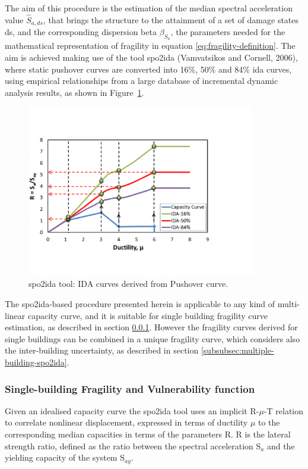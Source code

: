 The aim of this procedure is the estimation of the median spectral acceleration value $\hat{S}_{a,ds}$, that brings the structure to the attainment of a set of damage states ds, and the corresponding dispersion beta $\beta_{S_a}$, the parameters needed for the mathematical representation of fragility in equation \ref{eq:fragility-definition}. The aim is achieved making use of the tool spo2ida (Vamvatsikos and Cornell, 2006), where static pushover curves are converted into 16\%, 50\% and 84\% ida curves, using empirical relationships from a large database of incremental dynamic analysis results, as shown in Figure~\ref{fig:spo2ida}.

\begin{figure}[!htbp]
\centering
\includegraphics[width=10cm]{./figures/spo2ida.jpg}
\caption{spo2ida tool: IDA curves derived from Pushover curve.}
\label{fig:spo2ida}
\end{figure}

The spo2ida-based procedure presented herein is applicable to any kind of multi-linear capacity curve, and it is suitable for single building fragility curve estimation, as described in section \ref{subsubsec:single-building-spo2ida}. However the fragility curves derived for single buildings can be combined in a unique fragility curve, which considers also the inter-building uncertainty, as described in section \ref{subsubsec:multiple-building-spo2ida}.

\subsubsection{Single-building Fragility and Vulnerability function}
\label{subsubsec:single-building-spo2ida}
Given an idealised capacity curve the spo2ida tool uses an implicit R-$\mu$-T relation to correlate nonlinear displacement, expressed in terms of ductility $\mu$ to the corresponding median capacities in terms of the parameters R. R is the lateral strength ratio, defined as the ratio between the spectral acceleration S$_a$ and the yielding capacity of the system S$_{ay}$. \\


